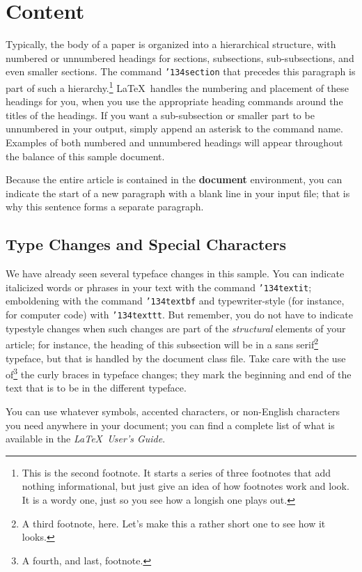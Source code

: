 \documentclass{acm_proc_article-sp}
\begin{document}
\section{Content}
Typically, the body of a paper is organized
into a hierarchical structure, with numbered or unnumbered
headings for sections, subsections, sub-subsections, and even
smaller sections.  The command \texttt{{\char'134}section} that
precedes this paragraph is part of such a
hierarchy.\footnote{This is the second footnote.  It
starts a series of three footnotes that add nothing
informational, but just give an idea of how footnotes work
and look. It is a wordy one, just so you see
how a longish one plays out.} \LaTeX\ handles the numbering
and placement of these headings for you, when you use
the appropriate heading commands around the titles
of the headings.  If you want a sub-subsection or
smaller part to be unnumbered in your output, simply append an
asterisk to the command name.  Examples of both
numbered and unnumbered headings will appear throughout the
balance of this sample document.

Because the entire article is contained in
the \textbf{document} environment, you can indicate the
start of a new paragraph with a blank line in your
input file; that is why this sentence forms a separate paragraph.

\subsection{Type Changes and {\subsecit Special} Characters}
We have already seen several typeface changes in this sample.  You
can indicate italicized words or phrases in your text with
the command \texttt{{\char'134}textit}; emboldening with the
command \texttt{{\char'134}textbf}
and typewriter-style (for instance, for computer code) with
\texttt{{\char'134}texttt}.  But remember, you do not
have to indicate typestyle changes when such changes are
part of the \textit{structural} elements of your
article; for instance, the heading of this subsection will
be in a sans serif\footnote{A third footnote, here.
Let's make this a rather short one to
see how it looks.} typeface, but that is handled by the
document class file. Take care with the use
of\footnote{A fourth, and last, footnote.}
the curly braces in typeface changes; they mark
the beginning and end of
the text that is to be in the different typeface.

You can use whatever symbols, accented characters, or
non-English characters you need anywhere in your document;
you can find a complete list of what is
available in the \textit{\LaTeX\
User's Guide}\cite{Lamport:LaTeX}.
\end{document}
